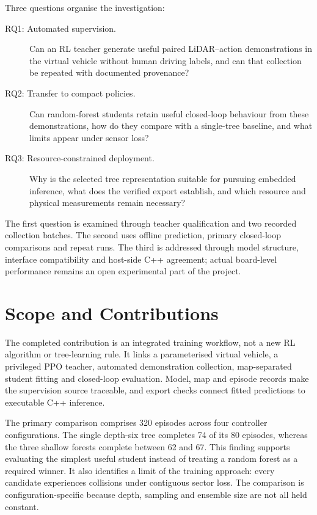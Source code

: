 Three questions organise the investigation:
\begin{description}
\item[RQ1: Automated supervision.] Can an RL teacher generate useful paired
LiDAR--action demonstrations in the virtual vehicle without human driving
labels, and can that collection be repeated with documented provenance?
\item[RQ2: Transfer to compact policies.] Can random-forest students retain
useful closed-loop behaviour from these demonstrations, how do they compare
with a single-tree baseline, and what limits appear under sensor loss?
\item[RQ3: Resource-constrained deployment.] Why is the selected tree
representation suitable for pursuing embedded inference, what does the verified
export establish, and which resource and physical measurements remain necessary?
\end{description}

The first question is examined through teacher qualification and two recorded
collection batches. The second uses offline prediction, primary closed-loop
comparisons and repeat runs. The third is addressed through model structure,
interface compatibility and host-side C++ agreement; actual board-level
performance remains an open experimental part of the project.

\section{Scope and Contributions}
The completed contribution is an integrated training workflow, not a new RL
algorithm or tree-learning rule. It links a parameterised virtual vehicle, a
privileged PPO teacher, automated demonstration collection, map-separated
student fitting and closed-loop evaluation. Model, map and episode records make
the supervision source traceable, and export checks connect fitted predictions
to executable C++ inference.

The primary comparison comprises 320 episodes across four controller
configurations. The single depth-six tree completes 74 of its 80 episodes,
whereas the three shallow forests complete between 62 and 67. This finding
supports evaluating the simplest useful student instead of treating a random
forest as a required winner. It also identifies a limit of the training approach:
every candidate experiences collisions under contiguous sector loss. The
comparison is configuration-specific because depth, sampling and ensemble size
are not all held constant.

